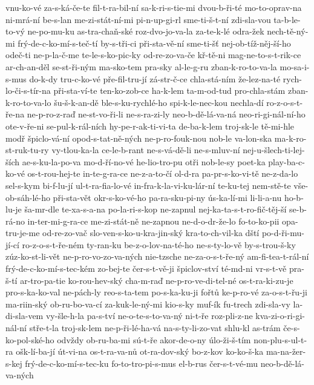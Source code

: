 {vnu-ko-vé
za-s-ká-če-te
fil-t-ra-bil-ní
sa-k-ri-s-tie-mi
dvou-b-ři-té
mo-to-oprav-na
ni-mrá-ní
be-s-lan
me-zi-stát-ní-mi
pi-n-up-gi-rl
sme-ti-š-t-ní
zdi-sla-vou
ta-b-le-to-vý
ne-po-mu-ku
as-tra-chaň-ské
roz-dvo-jo-va-la
za-te-k-lé
odra-žek
nech-tě-ný-mi
frý-de-c-ko-mí-s-teč-tí
by-s-tři-ci
při-sta-vě-ní
sme-ti-šť
nej-ob-tíž-něj-ší-ho
odeč-ti
ne-p-la-č-me
te-le-s-ko-pic-ky
od-re-zo-va-če
kř-tě-ni
mag-ne-to-s-t-rik-ce
ar-ch-an-děl
se-st-ři-ným
ma-sko-tem
pra-sky
al-le-g-ru
zban-k-ro-to-va-la
mo-sa-i-s-mus
do-k-dy
tru-c-ko-vé
pře-fil-tru-jí
zá-str-č-ce
chla-stá-ním
že-lez-na-té
rych-lo-či-s-tír-na
při-sta-ví-te
ten-ko-zob-ce
ha-k-lem
ta-m-od-tud
pro-chla-stám
zban-k-ro-to-va-lo
šu-š-k-an-dě
ble-s-ku-rychlé-ho
spi-k-le-nec-kou
nechla-dí
ro-z-o-s-t-ře-na
ne-p-ro-z-raď
ne-st-vo-ři-li
ne-s-ra-zi-ly
neo-b-dě-lá-va-ná
neo-ri-gi-nál-ní-ho
ote-v-ře-ni
se-pul-k-rál-ních
hy-pe-r-ak-ti-vi-ta
de-ba-k-lem
troj-sk-le
tě-mi-hle
modř
špiclo-vá-ní
opod-s-tat-ně-ných
ne-p-ro-fouk-nou
nob-le
va-lon-ska
ma-k-ro-st-ruk-tu-ry
vy-tlou-ka-la
ce-le-b-rant
ne-s-vá-dě-li
ne-s-mluv-ní
nej-u-šlech-ti-lej-ších
ae-s-ku-la-po-va
mo-d-ří-no-vé
he-lio-tro-pu
otři
nob-le-sy
poet-ka
play-ba-c-ko-vé
os-t-rou-hej-te
in-te-g-ra-ce
ne-z-a-to-čí
ol-d-ra
pa-pr-s-ko-vi-tě
ne-z-da-lo
sel-s-kym
bi-f-lu-jí
ul-t-ra-fia-lo-vé
in-fra-k-la-vi-ku-lár-ní
te-ku-tej
nem-stě-te
vše-ob-sáh-lé-ho
při-sta-vět
okr-s-ko-vé-ho
pa-ra-sku-pi-ny
ús-ka-lí-mi
li-li-a-nu
ho-b-lu-je
ša-mr-dle
te-xa-s-a-na
po-la-ri-s-kop
ne-zapnul
nej-ka-ta-s-t-ro-fič-těj-ší
se-b-rá-no
in-ter-mi-g-ra-ce
me-zi-stát-ně
ne-zapnou
ne-d-o-dr-že-lo
fo-to-ko-pii
opa-tru-je-me
od-re-zo-vač
slo-ven-s-ko-u-kra-jin-ský
kra-to-ch-vil-ka
dští
po-d-ři-mu-jí-cí
ro-z-o-s-t-ře-ném
ty-ran-ku
be-z-o-lov-na-té-ho
ne-s-ty-lo-vě
by-s-trou-š-ky
zúz-ko-st-li-vět
ne-p-ro-vo-zo-va-ných
nie-tzsche
ne-za-o-s-t-ře-ný
am-fi-tea-t-rál-ní
frý-de-c-ko-mí-s-tec-kém
zo-bej-te
čer-s-t-vě-ji
špiclov-ství
té-md-ni
vr-s-t-vě
pra-š-tí
ar-tro-pa-tie
ko-rou-hev-ský
cha-m-raď
ne-p-ro-ve-di-tel-né
os-t-ra-ki-zu-je
pro-s-ka-ko-val
ne-pách-ly
reo-s-ta-tem
po-s-ka-ku-ji
fořtů
ke-p-ro-vé
za-o-s-t-řu-ji
ma-riin-ský
ob-ru-bo-va-cí
za-kuk-le-ný-mi
kio-s-ky
muf-ík
fu-trech
zdi-sla-vy
la-di-sla-vem
vy-šle-h-la
pa-s-tví
ne-o-te-s-to-va-ný
ni-t-ře
roz-pli-z-ne
kva-zi-o-ri-gi-nál-ní
stře-t-la
troj-sk-lem
ne-p-ři-lé-ha-vá
na-s-ty-li-zo-vat
shlu-kl
as-trám
če-s-ko-pol-ské-ho
odvždy
ob-ru-ba-mi
sú-t-ře
akor-de-o-ny
úlo-ži-š-tím
non-plu-s-ul-t-ra
ošk-lí-ba-jí
út-vi-na
os-t-ra-va-nů
ot-ra-dov-ský
bo-z-kov
ko-ko-š-ka
ma-na-žer-s-kej
frý-de-c-ko-mí-s-tec-ku
fo-to-tro-pi-s-mus
el-b-rus
čer-s-t-vé-mu
neo-b-dě-lá-va-ných
}
